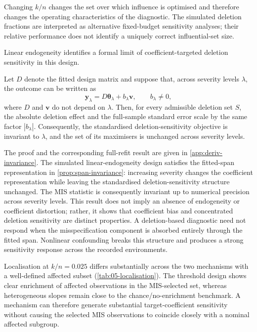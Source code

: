 \documentclass[../main.tex]{subfiles}
\begin{document}
Changing \(k/n\) changes the set over which influence is optimised and therefore changes the operating characteristics of the diagnostic. The simulated deletion fractions are interpreted as alternative fixed-budget sensitivity analyses; their relative performance does not identify a uniquely correct influential-set size.

Linear endogeneity identifies a formal limit of coefficient-targeted deletion sensitivity in this design.

\begin{proposition}
	\label{prop:span-invariance}
	Let \(D\) denote the fitted design matrix and suppose that, across severity levels \(\lambda\), the outcome can be written as
	\[
	\mathbf{y}_{\lambda}
	=
	D\boldsymbol{\theta}_{\lambda}
	+
	b_{\lambda}\mathbf{v},
	\qquad b_{\lambda}\neq0,
	\]
	where \(D\) and \(\mathbf{v}\) do not depend on \(\lambda\). Then, for every admissible deletion set \(S\), the absolute deletion effect and the full-sample standard error scale by the same factor \(|b_{\lambda}|\). Consequently, the standardised deletion-sensitivity objective is invariant to \(\lambda\), and the set of its maximisers is unchanged across severity levels.
\end{proposition}

The proof and the corresponding full-refit result are given in \autoref{app:deriv-invariance}. The simulated linear-endogeneity design satisfies the fitted-span representation in \autoref{prop:span-invariance}: increasing severity changes the coefficient representation while leaving the standardised deletion-sensitivity structure unchanged. The MIS statistic is consequently invariant up to numerical precision across severity levels. This result does not imply an absence of endogeneity or coefficient distortion; rather, it shows that coefficient bias and concentrated deletion sensitivity are distinct properties. A deletion-based diagnostic need not respond when the misspecification component is absorbed entirely through the fitted span. Nonlinear confounding breaks this structure and produces a strong sensitivity response across the recorded environments.

Localisation at \(k/n=0.025\) differs substantially across the two mechanisms with a well-defined affected subset (\autoref{tab:05-localisation}). The threshold design shows clear enrichment of affected observations in the MIS-selected set, whereas heterogeneous slopes remain close to the chance/no-enrichment benchmark. A mechanism can therefore generate substantial target-coefficient sensitivity without causing the selected MIS observations to coincide closely with a nominal affected subgroup.
\end{document}
